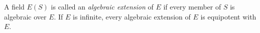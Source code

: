 A field $E(S)$ is called an \emph{algebraic extension} of $E$ if every member of $S$ is algebraic over $E$. If $E$ is infinite, every algebraic extension of $E$ is equipotent with $E$.